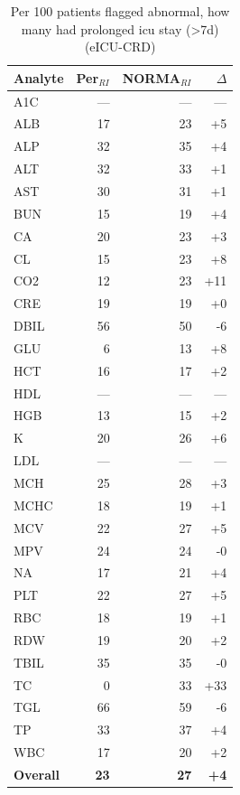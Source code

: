 \begin{table}[ht]
\centering
\footnotesize
\caption{Per 100 patients flagged abnormal, how many had prolonged icu stay (>7d) (eICU-CRD)}
\begin{tabular}{lrrr}
\toprule
Analyte & Per$_{RI}$ & NORMA$_{RI}$ & $\Delta$ \\
\midrule
A1C & --- & --- & --- \\
ALB & 17 & 23 & +5 \\
ALP & 32 & 35 & +4 \\
ALT & 32 & 33 & +1 \\
AST & 30 & 31 & +1 \\
BUN & 15 & 19 & +4 \\
CA & 20 & 23 & +3 \\
CL & 15 & 23 & +8 \\
CO2 & 12 & 23 & +11 \\
CRE & 19 & 19 & +0 \\
DBIL & 56 & 50 & -6 \\
GLU & 6 & 13 & +8 \\
HCT & 16 & 17 & +2 \\
HDL & --- & --- & --- \\
HGB & 13 & 15 & +2 \\
K & 20 & 26 & +6 \\
LDL & --- & --- & --- \\
MCH & 25 & 28 & +3 \\
MCHC & 18 & 19 & +1 \\
MCV & 22 & 27 & +5 \\
MPV & 24 & 24 & -0 \\
NA & 17 & 21 & +4 \\
PLT & 22 & 27 & +5 \\
RBC & 18 & 19 & +1 \\
RDW & 19 & 20 & +2 \\
TBIL & 35 & 35 & -0 \\
TC & 0 & 33 & +33 \\
TGL & 66 & 59 & -6 \\
TP & 33 & 37 & +4 \\
WBC & 17 & 20 & +2 \\
\midrule
\textbf{Overall} & \textbf{23} & \textbf{27} & \textbf{+4} \\
\bottomrule
\end{tabular}
\end{table}